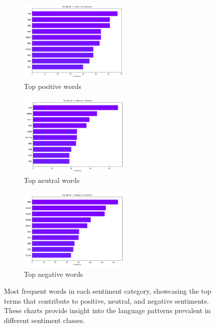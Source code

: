 \documentclass[12pt]{article}
\begin{document}
\begin{figure}[H]
	\centering
	\begin{subfigure}[b]{0.32\textwidth}
		\includegraphics[height=4cm]{top_words_positive.png}
		\caption{Top positive words}
	\end{subfigure}
	\hfill
	\begin{subfigure}[b]{0.32\textwidth}
		\includegraphics[height=4cm]{top_words_neutral.png}
		\caption{Top neutral words}
	\end{subfigure}
	\hfill
	\begin{subfigure}[b]{0.32\textwidth}
		\includegraphics[height=4cm]{top_words_negative.png}
		\caption{Top negative words}
	\end{subfigure}
	\caption{Most frequent words in each sentiment category, showcasing the top terms that contribute to positive, neutral, and negative sentiments. These charts provide insight into the language patterns prevalent in different sentiment classes.}
	\label{fig:top_words}
\end{figure}
\end{document}
